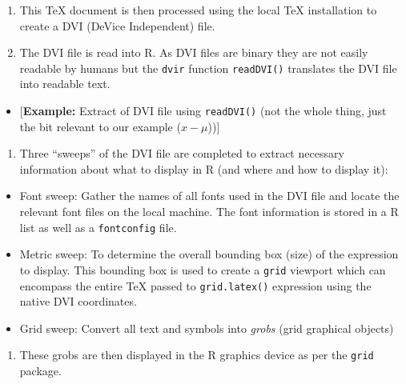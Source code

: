 \documentclass[]{article}
\providecommand{\tightlist}{%
  \setlength{\itemsep}{0pt}\setlength{\parskip}{0pt}}
\begin{document}
\begin{enumerate}
\def\labelenumi{\arabic{enumi}.}
\setcounter{enumi}{1}
\item
  This TeX document is then processed using the local \TeX{}
  installation to create a DVI (DeVice Independent) file.
\item
  The DVI file is read into R. As DVI files are binary they are not
  easily readable by humans but the \texttt{dvir} function
  \texttt{readDVI()} translates the DVI file into readable text.
\end{enumerate}

\begin{itemize}
\tightlist
\item
  {[}\textbf{Example:} Extract of DVI file using \texttt{readDVI()} (not
  the whole thing, just the bit relevant to our example
  (\(x - \mu\))){]}
\end{itemize}

\begin{enumerate}
\def\labelenumi{\arabic{enumi}.}
\setcounter{enumi}{3}
\tightlist
\item
  Three ``sweeps'' of the DVI file are completed to extract necessary
  information about what to display in R (and where and how to display
  it):
\end{enumerate}

\begin{itemize}
\item
  Font sweep: Gather the names of all fonts used in the DVI file and
  locate the relevant font files on the local machine. The font
  information is stored in a R list as well as a \texttt{fontconfig}
  file.
\item
  Metric sweep: To determine the overall bounding box (size) of the
  expression to display. This bounding box is used to create a
  \texttt{grid} viewport which can encompass the entire \TeX{} passed to
  \texttt{grid.latex()} expression using the native DVI coordinates.
\item
  Grid sweep: Convert all text and symbols into \emph{grobs} (grid
  graphical objects)
\end{itemize}

\begin{enumerate}
\def\labelenumi{\arabic{enumi}.}
\setcounter{enumi}{4}
\tightlist
\item
  These grobs are then displayed in the R graphics device as per the
  \texttt{grid} package.
\end{enumerate}
\end{document}
